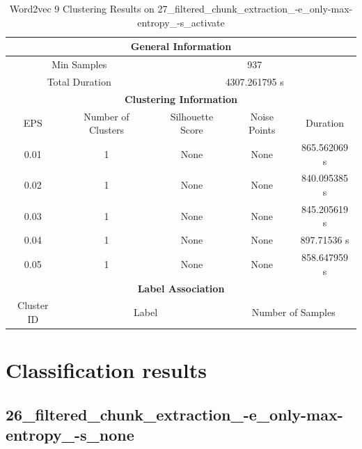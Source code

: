 \begin{longtable}{|c|c|c|c|c|}
\caption{Word2vec 9 Clustering Results on 27\_filtered\_chunk\_extraction\_-e\_only-max-entropy\_-s\_activate} \label{tab:27_filtered_chunk_extraction_-e_only-max-entropy_-s_activate_word2vec_9_clustering_results}\\
\hline
\multicolumn{5}{|c|}{\textbf{General Information}} \\
\hline
\multicolumn{2}{|c|}{Min Samples} & \multicolumn{3}{c|}{937} \\
\multicolumn{2}{|c|}{Total Duration} & \multicolumn{3}{c|}{4307.261795 s} \\
\hline
\multicolumn{5}{|c|}{\textbf{Clustering Information}} \\
\hline
EPS & Number of Clusters & Silhouette Score & Noise Points & Duration \\
0.01 & 1 & None & None & 865.562069 s\\
0.02 & 1 & None & None & 840.095385 s\\
0.03 & 1 & None & None & 845.205619 s\\
0.04 & 1 & None & None & 897.71536 s\\
0.05 & 1 & None & None & 858.647959 s\\
\hline
\multicolumn{5}{|c|}{\textbf{Label Association}} \\
\hline
Cluster ID & \multicolumn{2}{c|}{Label} & \multicolumn{2}{c|}{Number of Samples} \\
\hline
\end{longtable}


\section{Classification results}

\label{sec:annexe:classification_results}

\subsection{26\_filtered\_chunk\_extraction\_-e\_only-max-entropy\_-s\_none}


